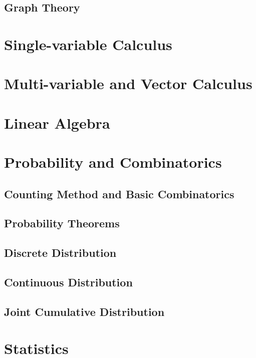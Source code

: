 \documentclass[
	12pt, %
	fleqn, %
	a4paper, %
]{LegrandOrangeBook}
\begin{document}
\chapter{Graph Theory}

\part{Single-variable Calculus}
\part{Multi-variable and Vector Calculus}

\part{Linear Algebra}
\part{Probability and Combinatorics}

\chapterspaceabove{6.75cm} 
\chapterspacebelow{7.25cm} 
\chapter{Counting Method and Basic Combinatorics}


\chapterspaceabove{6.75cm} 
\chapterspacebelow{7.25cm} 
\chapter{Probability Theorems}


\chapterspaceabove{6.75cm} 
\chapterspacebelow{7.25cm} 
\chapter{Discrete Distribution}


\chapterspaceabove{6.75cm} 
\chapterspacebelow{7.25cm} 
\chapter{Continuous Distribution}


\chapterspaceabove{6.75cm} 
\chapterspacebelow{7.25cm} 
\chapter{Joint Cumulative Distribution}
\part{Statistics}



\stopcontents[part] %
\end{document}
